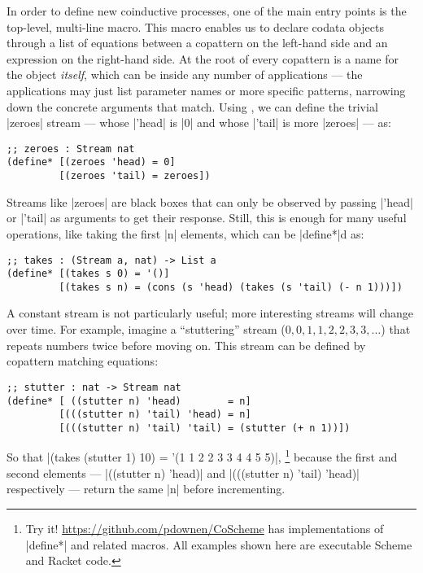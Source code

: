 In order to define new coinductive processes, one of the main entry points is the top-level, multi-line  macro.
This macro enables us to declare codata objects through a list of equations between a copattern on the left-hand side and an expression on the right-hand side.
At the root of every copattern is a name for the object \emph{itself}, which can be inside any number of applications --- the applications may just list parameter names or more specific patterns, narrowing down the concrete arguments that match.
Using , we can define the trivial \scm|zeroes| stream  --- whose \scm|'head| is \scm|0| and whose \scm|'tail| is more \scm|zeroes| --- as:
\begin{verbatim}
;; zeroes : Stream nat
(define* [(zeroes 'head) = 0]
         [(zeroes 'tail) = zeroes])
\end{verbatim}
Streams like \scm|zeroes| are black boxes that can only be observed by passing \scm|'head| or \scm|'tail| as arguments to get their response.
Still, this is enough for many useful operations, like taking the first \scm|n| elements, which can be \scm|define*|d as:
\begin{verbatim}
;; takes : (Stream a, nat) -> List a
(define* [(takes s 0) = '()]
         [(takes s n) = (cons (s 'head) (takes (s 'tail) (- n 1)))])
\end{verbatim}
A constant stream is not particularly useful; more interesting streams will change over time.
For example, imagine a ``stuttering'' stream ($0, 0, 1, 1, 2, 2, 3, 3, \dots$) that repeats numbers twice before moving on.
This stream can be defined by copattern matching equations:
\begin{verbatim}
;; stutter : nat -> Stream nat
(define* [ ((stutter n) 'head)        = n]
         [(((stutter n) 'tail) 'head) = n]
         [(((stutter n) 'tail) 'tail) = (stutter (+ n 1))])
\end{verbatim}
So that \scm|(takes (stutter 1) 10) = '(1 1 2 2 3 3 4 4 5 5)|,%
\footnote{
  Try it!
  \url{https://github.com/pdownen/CoScheme} has implementations of \scm|define*| and related macros.
  All examples shown here are executable Scheme and Racket code.
}
because the first and second elements --- \scm|((stutter n) 'head)| and \scm|(((stutter n) 'tail) 'head)| respectively --- return the same \scm|n| before incrementing.

